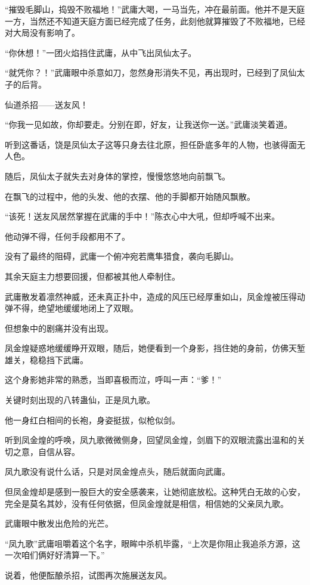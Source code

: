 \begin{this_body}
“摧毁毛脚山，捣毁不败福地！”武庸大喝，一马当先，冲在最前面。他并不是天庭一方，当然还不知道天庭方面已经完成了任务，此刻他就算摧毁了不败福地，已经对大局没有影响了。

“你休想！”一团火焰挡住武庸，从中飞出凤仙太子。

“就凭你？！”武庸眼中杀意如刀，忽然身形消失不见，再出现时，已经到了凤仙太子的后背。

仙道杀招——送友风！

“你我一见如故，你却要走。分别在即，好友，让我送你一送。”武庸淡笑着道。

听到这番话，饶是凤仙太子这等只身去往北原，担任卧底多年的人物，也骇得面无人色。

随后，凤仙太子就失去对身体的掌控，慢慢悠悠地向前飘飞。

在飘飞的过程中，他的头发、他的衣摆、他的手脚都开始随风飘散。

“该死！送友风居然掌握在武庸的手中！”陈衣心中大吼，但却呼喊不出来。

他动弹不得，任何手段都用不了。

没有了最终的阻碍，武庸一个俯冲宛若鹰隼猎食，袭向毛脚山。

其余天庭主力想要回援，但都被其他人牵制住。

武庸散发着凛然神威，还未真正扑中，造成的风压已经厚重如山，凤金煌被压得动弹不得，绝望地缓缓地闭上了双眼。

但想象中的剧痛并没有出现。

凤金煌疑惑地缓缓睁开双眼，随后，她便看到一个身影，挡住她的身前，仿佛天堑雄关，稳稳挡下武庸。

这个身影她非常的熟悉，当即喜极而泣，呼叫一声：“爹！”

关键时刻出现的八转蛊仙，正是凤九歌。

他一身红白相间的长袍，身姿挺拔，似枪似剑。

听到凤金煌的呼唤，凤九歌微微侧身，回望凤金煌，剑眉下的双眼流露出温和的关切之意，自信从容。

凤九歌没有说什么话，只是对凤金煌点头，随后就面向武庸。

但凤金煌却是感到一股巨大的安全感袭来，让她彻底放松。这种凭白无故的心安，完全是莫名其妙，没有任何依据，但凤金煌就是相信，相信她的父亲凤九歌。

武庸眼中散发出危险的光芒。

“凤九歌”武庸咀嚼着这个名字，眼眸中杀机毕露，“上次是你阻止我追杀方源，这一次咱们俩好好清算一下。”

说着，他便酝酿杀招，试图再次施展送友风。


\end{this_body}

